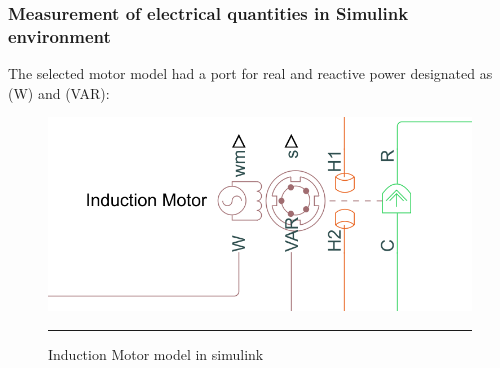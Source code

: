 \subsubsection{Measurement of electrical quantities in Simulink environment}
The selected motor model had a port for real and reactive power designated as (W) and (VAR):
\begin{figure}[htbp]
	\centering
		\includegraphics[width = 4.5in]{./Figures/MS/fig324.png}
		\rule{35em}{0.5pt}
	\caption{Induction Motor model in simulink}
	\label{fig:Induction Motor model in simulink} 
\end{figure}

